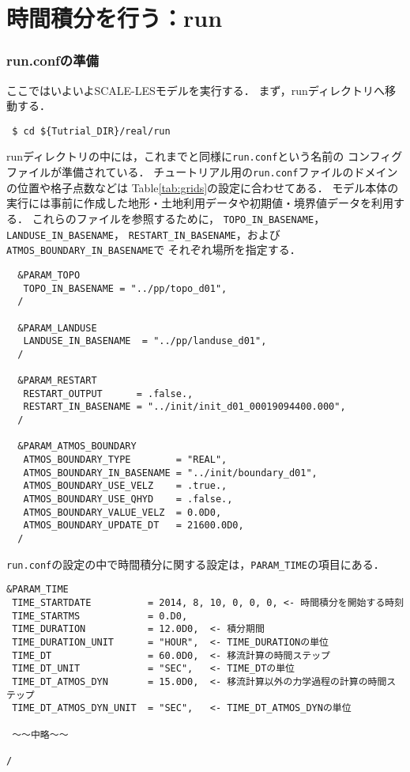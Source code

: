 
\section{時間積分を行う：run}
\subsubsection{run.confの準備}
ここではいよいよSCALE-LESモデルを実行する．
まず，runディレクトリへ移動する．
\begin{verbatim}
 $ cd ${Tutrial_DIR}/real/run
\end{verbatim}

runディレクトリの中には，これまでと同様に\verb|run.conf|という名前の
コンフィグファイルが準備されている．
チュートリアル用の\verb|run.conf|ファイルのドメインの位置や格子点数などは
Table\ref{tab:grids}の設定に合わせてある．
モデル本体の実行には事前に作成した地形・土地利用データや初期値・境界値データを利用する．
これらのファイルを参照するために，
\verb|TOPO_IN_BASENAME|，\verb|LANDUSE_IN_BASENAME|，
\verb|RESTART_IN_BASENAME|，および\verb|ATMOS_BOUNDARY_IN_BASENAME|で
それぞれ場所を指定する．

\begin{verbatim}
  &PARAM_TOPO
   TOPO_IN_BASENAME = "../pp/topo_d01",
  /

  &PARAM_LANDUSE
   LANDUSE_IN_BASENAME  = "../pp/landuse_d01",
  /

  &PARAM_RESTART
   RESTART_OUTPUT      = .false.,
   RESTART_IN_BASENAME = "../init/init_d01_00019094400.000",
  /

  &PARAM_ATMOS_BOUNDARY
   ATMOS_BOUNDARY_TYPE        = "REAL",
   ATMOS_BOUNDARY_IN_BASENAME = "../init/boundary_d01",
   ATMOS_BOUNDARY_USE_VELZ    = .true.,
   ATMOS_BOUNDARY_USE_QHYD    = .false.,
   ATMOS_BOUNDARY_VALUE_VELZ  = 0.0D0,
   ATMOS_BOUNDARY_UPDATE_DT   = 21600.0D0,
  /

\end{verbatim}


\verb|run.conf|の設定の中で時間積分に関する設定は，\verb|PARAM_TIME|の項目にある．
\begin{verbatim}
&PARAM_TIME
 TIME_STARTDATE          = 2014, 8, 10, 0, 0, 0, <- 時間積分を開始する時刻
 TIME_STARTMS            = 0.D0,
 TIME_DURATION           = 12.0D0,  <- 積分期間
 TIME_DURATION_UNIT      = "HOUR",  <- TIME_DURATIONの単位
 TIME_DT                 = 60.0D0,  <- 移流計算の時間ステップ
 TIME_DT_UNIT            = "SEC",   <- TIME_DTの単位
 TIME_DT_ATMOS_DYN       = 15.0D0,  <- 移流計算以外の力学過程の計算の時間ステップ
 TIME_DT_ATMOS_DYN_UNIT  = "SEC",   <- TIME_DT_ATMOS_DYNの単位

 ～～中略～～

/
\end{verbatim}

